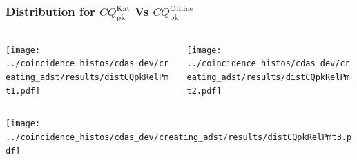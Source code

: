 \documentclass[aspectratio=169]{beamer}
\begin{document}
\begin{frame}
  \frametitle{Distribution for $CQ^{\mathrm{Kat}}_{\mathrm{pk}}$ Vs
  $CQ^{\mathrm{Offline}}_{\mathrm{pk}}$}
  \vspace{0.1cm}
  \begin{columns}
    \centering
    \begin{column}{0.5\textwidth}
      \texttt{[image: ../coincidence\_histos/cdas\_dev/creating\_adst/results/distCQpkRelPmt1.pdf]}
    \end{column}
    \begin{column}{0.5\textwidth}
      \texttt{[image: ../coincidence\_histos/cdas\_dev/creating\_adst/results/distCQpkRelPmt2.pdf]}
    \end{column}
  \end{columns}
  \begin{columns}
    \centering
    \begin{column}{0.5\textwidth}
      \texttt{[image: ../coincidence\_histos/cdas\_dev/creating\_adst/results/distCQpkRelPmt3.pdf]}
    \end{column}
  \end{columns}
\end{frame}
\end{document}
